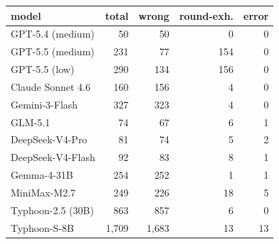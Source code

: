 \begin{tabular}{@{}lrrrr@{}}
\toprule
\textbf{model} & \textbf{total} & \textbf{wrong} & \textbf{round-exh.} & \textbf{error} \\
\midrule
GPT-5.4 (medium) & 50 & 50 & 0 & 0 \\
GPT-5.5 (medium) & 231 & 77 & 154 & 0 \\
GPT-5.5 (low) & 290 & 134 & 156 & 0 \\
Claude Sonnet 4.6 & 160 & 156 & 4 & 0 \\
Gemini-3-Flash & 327 & 323 & 4 & 0 \\
GLM-5.1 & 74 & 67 & 6 & 1 \\
DeepSeek-V4-Pro & 81 & 74 & 5 & 2 \\
DeepSeek-V4-Flash & 92 & 83 & 8 & 1 \\
Gemma-4-31B & 254 & 252 & 1 & 1 \\
MiniMax-M2.7 & 249 & 226 & 18 & 5 \\
Typhoon-2.5 (30B) & 863 & 857 & 6 & 0 \\
Typhoon-S-8B & 1{,}709 & 1{,}683 & 13 & 13 \\
\bottomrule
\end{tabular}
